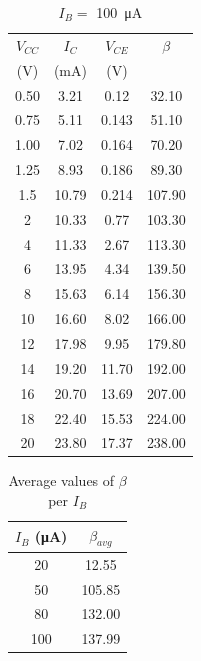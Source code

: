 \begin{table}[hbtp]
  \centering
  \begin{tabular}{cccc}
    $V_{CC}$ & $I_C$     & $V_{CE}$ & $\beta$ \\
    (\si{V}) & (\si{mA}) & (\si{V}) &         \\
    \hline
    0.50     & 3.21      & 0.12     & 32.10   \\
    0.75     & 5.11      & 0.143    & 51.10   \\
    1.00     & 7.02      & 0.164    & 70.20   \\
    1.25     & 8.93      & 0.186    & 89.30   \\
    1.5      & 10.79     & 0.214    & 107.90  \\
    2        & 10.33     & 0.77     & 103.30  \\
    4        & 11.33     & 2.67     & 113.30  \\
    6        & 13.95     & 4.34     & 139.50  \\
    8        & 15.63     & 6.14     & 156.30  \\
    10       & 16.60     & 8.02     & 166.00  \\
    12       & 17.98     & 9.95     & 179.80  \\
    14       & 19.20     & 11.70    & 192.00  \\
    16       & 20.70     & 13.69    & 207.00  \\
    18       & 22.40     & 15.53    & 224.00  \\
    20       & 23.80     & 17.37    & 238.00  \\
    \end{tabular}
    \caption{\label{tab:4}$I_B = $ \SI{100}{\micro\ampere}}
\end{table}

\begin{table}[hbtp]
  \centering
  \begin{tabular}{cc}
    $I_B$ (\si{\micro\ampere}) & $\beta_{avg}$ \\
    \hline
    20                         & 12.55         \\
    50                         & 105.85        \\
    80                         & 132.00        \\
    100                        & 137.99        \\
  \end{tabular}
  \caption{\label{tab:beta_IB} Average values of $\beta$ per $I_B$}
\end{table}

